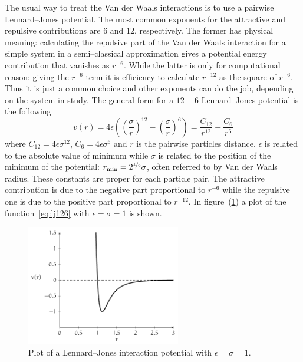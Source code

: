 The usual way to treat the Van der Waals interactions is to use a pairwise Lennard--Jones potential. The most 
common exponents for the attractive and repulsive contributions are $6$ and $12$, respectively. The former has 
physical meaning: calculating the repulsive part of the Van der Waals interaction for a simple system in a 
semi--classical approximation gives a potential energy contribution that vanishes as $r^{-6}$. While the latter 
is only for computational reason: giving the $r^{-6}$ term it is efficiency to calculate $r^{-12}$ as the square 
of $r^{-6}$. Thus it is just a common choice and other exponents can do the job, depending on the system in 
study. The general form for a $12-6$ Lennard--Jones potential is the following
\begin{equation}
	v(r) = 4\epsilon\left ( \left ( \frac{\sigma}{r}\right )^{12}  - \left ( \frac{\sigma}{r} \right )^6 \right ) = \frac{C_{12}}{r^{12}} - \frac{C_{6}}{r^{6}}
	\label{eq:lj126}
\end{equation}
where $C_{12} = 4\epsilon\sigma^{12}$, $C_{6} = 4\epsilon\sigma^{6}$ and $r$ is the pairwise particles distance. 
$\epsilon$ is related to the absolute value of minimum while $\sigma$ is related to the position of the minimum 
of the potential: $r_{\text{min}} = 2^{\nicefrac{1}{6}}\sigma$, often referred to by Van der Waals radius. These 
constants are proper for each particle pair. The attractive contribution is due to the negative part proportional 
to $r^{-6}$ while the repulsive one is due to the positive part proportional to $r^{-12}$. In 
figure~(\ref{fig:LG12511}) a plot of the function~\eqref{eq:lj126} with $\epsilon = \sigma = 1$ is shown.
\begin{figure}[!ht]
\centering
	\includegraphics[width=0.6\textwidth]{./img/LJ126/LJ126}
	\caption{Plot of a Lennard--Jones interaction potential with $\epsilon = \sigma = 1$.}
	\label{fig:LG12511}
\end{figure}

